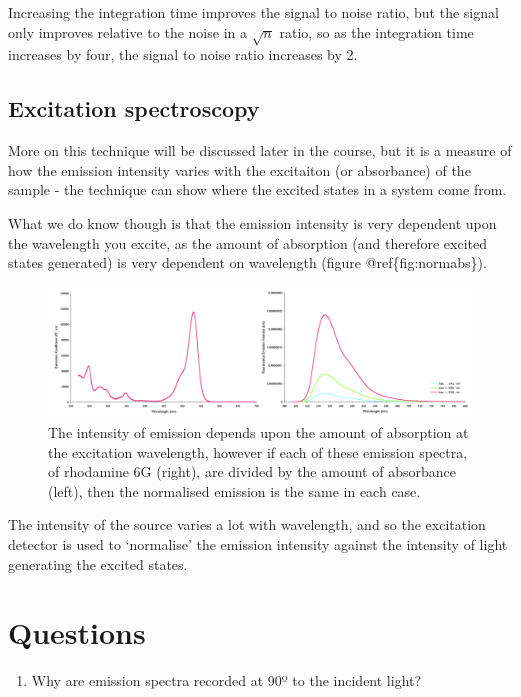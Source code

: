 \documentclass[
]{book}
\providecommand{\tightlist}{%
  \setlength{\itemsep}{0pt}\setlength{\parskip}{0pt}}
\begin{document}
Increasing the integration time improves the signal to noise ratio, but the signal only improves relative to the noise in a \(\sqrt{n}\) ratio, so as the integration time increases by four, the signal to noise ratio increases by 2.

\hypertarget{excitation-spectroscopy}{%
\subsection{Excitation spectroscopy}\label{excitation-spectroscopy}}

More on this technique will be discussed later in the course, but it is a measure of how the emission intensity varies with the excitaiton (or absorbance) of the sample - the technique can show where the excited states in a system come from.

What we do know though is that the emission intensity is very dependent upon the wavelength you excite, as the amount of absorption (and therefore excited states generated) is very dependent on wavelength (figure @ref\{fig:normabs\}).

\begin{figure}

{\centering \includegraphics[width=0.4\linewidth]{images/normabs} 

}

\caption{The intensity of emission depends upon the amount of absorption at the excitation wavelength, however if each of these emission spectra, of rhodamine 6G (right), are divided by the amount of absorbance (left), then the normalised emission is the same in each case.}\label{fig:normabs}
\end{figure}

The intensity of the source varies a lot with wavelength, and so the excitation detector is used to `normalise' the emission intensity against the intensity of light generating the excited states.

\hypertarget{questions}{%
\section{Questions}\label{questions}}

\begin{enumerate}
\def\labelenumi{\arabic{enumi}.}
\tightlist
\item
  Why are emission spectra recorded at 90º to the incident light?
\end{enumerate}
\end{document}
